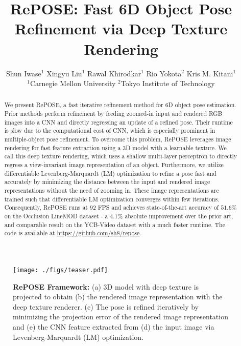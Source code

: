 \documentclass[10pt,twocolumn,letterpaper]{article}
\begin{document}
\title{RePOSE: Fast 6D Object Pose Refinement via Deep Texture Rendering}

\author{
Shun Iwase$^1$ \qquad 
Xingyu Liu$^1$ \qquad 
Rawal Khirodkar$^1$ \qquad
Rio Yokota$^2$ \qquad
Kris M. Kitani$^1$
\\$^1$Carnegie Mellon University \qquad $^2$Tokyo Institute of Technology \\
}



\maketitle
\ificcvfinal\thispagestyle{empty}\fi

\begin{abstract}
  We present RePOSE, a fast iterative refinement method for 6D object pose estimation. Prior methods perform refinement by feeding zoomed-in input and rendered RGB images into a CNN and directly regressing an update of a refined pose. Their runtime is slow due to the computational cost of CNN, which is especially prominent in multiple-object pose refinement. To overcome this problem, RePOSE leverages image rendering for fast feature extraction using a 3D model with a learnable texture. We call this deep texture rendering, which uses a shallow multi-layer perceptron to directly regress a view-invariant image representation of an object. Furthermore, we utilize differentiable Levenberg-Marquardt (LM) optimization to refine a pose fast and accurately by minimizing the distance between the input and rendered image representations without the need of zooming in. These image representations are trained such that differentiable LM optimization converges within few iterations. 
Consequently, RePOSE runs at $92$ FPS and achieves state-of-the-art accuracy of $51.6$\% on the Occlusion LineMOD dataset - a $4.1$\% absolute improvement over the prior art, and comparable result on the YCB-Video dataset with a much faster runtime. The code is available at \href{https://github.com/sh8/repose}{https://github.com/sh8/repose}.
\end{abstract}




\begin{figure}[t]
\hspace*{-0.2cm}
\centering
\texttt{[image: ./figs/teaser.pdf]}
\caption{\textbf{RePOSE Framework:} (a) 3D model with deep texture is projected to obtain (b) the rendered image representation with the deep texture renderer. (c) The pose is refined iteratively by minimizing the projection error of the rendered image representation and (e) the CNN feature extracted from (d) the input image via Levenberg-Marquardt (LM) optimization.
}
\label{fig:pipeline}
\end{figure}
\end{document}

